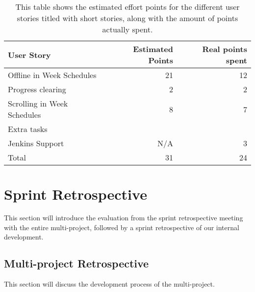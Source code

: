 \begin{table}[h]
    {\setlength{\extrarowheight}{1ex}%
    \begin{tabularx}{\textwidth}{X|r|r}
        \toprule
		User Story                  & Estimated Points & Real points spent \\
		\midrule
		Offline in Week Schedules   & 21               & 12                \\
		Progress clearing           & 2                & 2                 \\
		Scrolling in Week Schedules & 8                & 7                 \\
		\midrule
		Extra tasks															\\
		\midrule
		Jenkins Support             & N/A             & 3                 \\
		Total                       & 31               & 24               \\
		\bottomrule
	\end{tabularx}}
	\centering
	\caption{This table shows the estimated effort points for the different user stories titled with short stories, along with the amount of points actually spent. }
	\label{sprint_review2}
\end{table}


\section{Sprint Retrospective}
This section will introduce the evaluation from the sprint retrospective meeting with the entire multi-project, followed by a sprint retrospective of our internal development.
\subsection*{Multi-project Retrospective}
This section will discuss the development process of the multi-project.
